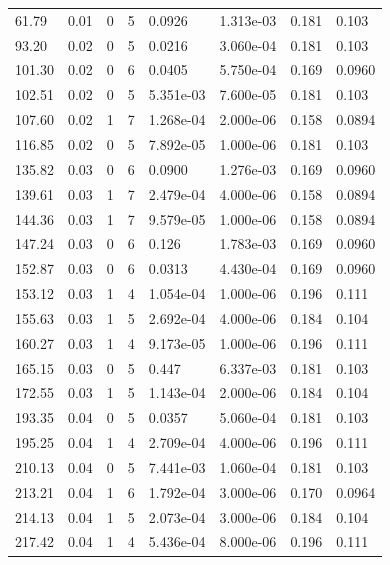 \documentclass[preview]{standalone}
\begin{document}
{{\begin{tabular}{L{1.2cm}C{1.2cm} C{0.3cm}C{0.5cm} C{1.4cm}C{1.4cm} C{1.4cm}C{1.4cm}}
  61.79  &  0.01  & 0     &  5 &  0.0926  & 1.313e-03  & 0.181 &  0.103   \\ 
  93.20  &  0.02  & 0     &  5 &  0.0216  & 3.060e-04  & 0.181 &  0.103   \\ 
  101.30  &  0.02  & 0     &  6 &  0.0405  & 5.750e-04  & 0.169 &  0.0960   \\ 
  102.51  &  0.02  & 0     &  5 &  5.351e-03  & 7.600e-05  & 0.181 &  0.103   \\ 
  107.60  &  0.02  & 1     &  7 &  1.268e-04  & 2.000e-06  & 0.158 &  0.0894   \\ 
  116.85  &  0.02  & 0     &  5 &  7.892e-05  & 1.000e-06  & 0.181 &  0.103   \\ 
  135.82  &  0.03  & 0     &  6 &  0.0900  & 1.276e-03  & 0.169 &  0.0960   \\ 
  139.61  &  0.03  & 1     &  7 &  2.479e-04  & 4.000e-06  & 0.158 &  0.0894   \\ 
  144.36  &  0.03  & 1     &  7 &  9.579e-05  & 1.000e-06  & 0.158 &  0.0894   \\ 
  147.24  &  0.03  & 0     &  6 &  0.126  & 1.783e-03  & 0.169 &  0.0960   \\ 
  152.87  &  0.03  & 0     &  6 &  0.0313  & 4.430e-04  & 0.169 &  0.0960   \\ 
  153.12  &  0.03  & 1     &  4 &  1.054e-04  & 1.000e-06  & 0.196 &  0.111   \\ 
  155.63  &  0.03  & 1     &  5 &  2.692e-04  & 4.000e-06  & 0.184 &  0.104   \\ 
  160.27  &  0.03  & 1     &  4 &  9.173e-05  & 1.000e-06  & 0.196 &  0.111   \\ 
  165.15  &  0.03  & 0     &  5 &  0.447  & 6.337e-03  & 0.181 &  0.103   \\ 
  172.55  &  0.03  & 1     &  5 &  1.143e-04  & 2.000e-06  & 0.184 &  0.104   \\ 
  193.35  &  0.04  & 0     &  5 &  0.0357  & 5.060e-04  & 0.181 &  0.103   \\ 
  195.25  &  0.04  & 1     &  4 &  2.709e-04  & 4.000e-06  & 0.196 &  0.111   \\ 
  210.13  &  0.04  & 0     &  5 &  7.441e-03  & 1.060e-04  & 0.181 &  0.103   \\ 
  213.21  &  0.04  & 1     &  6 &  1.792e-04  & 3.000e-06  & 0.170 &  0.0964   \\ 
  214.13  &  0.04  & 1     &  5 &  2.073e-04  & 3.000e-06  & 0.184 &  0.104   \\ 
  217.42  &  0.04  & 1     &  4 &  5.436e-04  & 8.000e-06  & 0.196 &  0.111   \\ 

\end{tabular}}}
\end{document}
